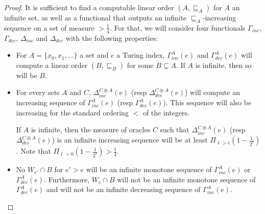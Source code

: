 \documentclass[10pt,a4paper]{amsart}
\newcommand{\ludovic}[1]{\textcolor{blue}{#1}}
\newcommand{\quentin}[1]{\textcolor{green}{#1}}
\begin{document}
\begin{proof}
It is sufficient to find a computable linear order $(A, \sqsubseteq_A)$ for $A$ an infinite set, as well as a functional that outputs an infinite $\sqsubseteq_A$-increasing sequence on a set of measure $> \frac{1}{4}$.
For that, we will consider four functionals $\Gamma_{inc}$, $\Gamma_{dec}$, $\Delta_{inc}$ and $\Delta_{dec}$ with the following properties:
\begin{itemize}
    \item For $A = \{x_0, x_1, \dots \}$ a set and $e$ a Turing index, $\Gamma^A_{inc}(e)$ and $\Gamma^A_{dec}(e)$ will compute a linear order $(B,\sqsubseteq_B)$ for some $B \subseteq A$. If $A$ is infinite, then so will be $B$.
    
    \item For every sets $A$ and $C$, $\Delta^{C\oplus A}_{inc}(e)$ (resp $\Delta^{C\oplus A}_{dec}(e)$) will compute an increasing sequence of $\Gamma^A_{inc}(e)$ (resp $\Gamma^A_{dec}(e)$). This sequence will also be increasing for the standard ordering $<$ of the integers.
 
    If $A$ is infinite, then the measure of oracles $C$ such that $\Delta^{C\oplus A}_{inc}(e)$ (resp $\Delta^{C\oplus A}_{dec}(e)$) is an infinite increasing sequence will be at least $\Pi_{\ell > e} (1 - \frac{1}{2^{\ell}})$. Note that $\Pi_{\ell > 0} (1 - \frac{1}{2^{\ell}}) > \frac{1}{4}$.
    
    \item No $W_{e'} \cap B$ for $e' > e$ will be an infinite monotone sequence of $\Gamma^A_{inc}(e)$ or $\Gamma^A_{dec}(e)$. Furthermore, $W_{e} \cap B$ will not be an infinite monotone
    sequence of $\Gamma^A_{dec}(e)$ and will not be an infinite decreasing sequence of $\Gamma^A_{inc}(e)$.
\end{itemize}


\end{proof}
\end{document}
